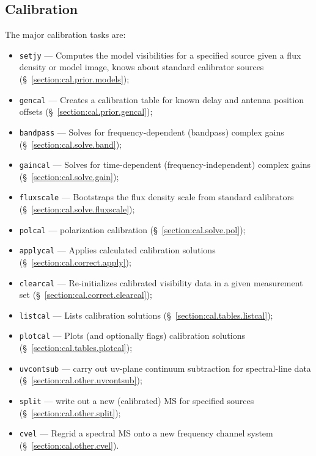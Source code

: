 \subsection{Calibration}
\label{section:intro.walkthru.calib}

The major calibration tasks are:
\begin{itemize}
   \item {\tt setjy} --- Computes the model visibilities for a specified source
         given a flux density or model image, knows about standard
         calibrator sources (\S~\ref{section:cal.prior.models});
   \item {\tt gencal} --- Creates a calibration table for known delay
         and antenna position offsets
         (\S~\ref{section:cal.prior.gencal});
   \item {\tt bandpass} --- Solves for frequency-dependent (bandpass) complex
         gains (\S~\ref{section:cal.solve.band});
   \item {\tt gaincal} --- Solves for time-dependent
         (frequency-independent) complex gains 
         (\S~\ref{section:cal.solve.gain});
   \item {\tt fluxscale} --- Bootstraps the flux density scale from standard
         calibrators (\S~\ref{section:cal.solve.fluxscale});
   \item {\tt polcal} --- polarization calibration
         (\S~\ref{section:cal.solve.pol});
   \item {\tt applycal} --- Applies calculated calibration solutions 
         (\S~\ref{section:cal.correct.apply});
   \item {\tt clearcal} --- Re-initializes calibrated visibility data 
         in a given measurement set (\S~\ref{section:cal.correct.clearcal});
   \item {\tt listcal} --- Lists calibration solutions 
         (\S~\ref{section:cal.tables.listcal});
   \item {\tt plotcal} --- Plots (and optionally flags) calibration
         solutions (\S~\ref{section:cal.tables.plotcal});
   \item {\tt uvcontsub} --- carry out uv-plane continuum subtraction
         for spectral-line data (\S~\ref{section:cal.other.uvcontsub});
   \item {\tt split} --- write out a new (calibrated) MS for specified
         sources (\S~\ref{section:cal.other.split});
   \item {\tt cvel} --- Regrid a spectral MS onto a new frequency
         channel system (\S~\ref{section:cal.other.cvel}).
\end{itemize}

